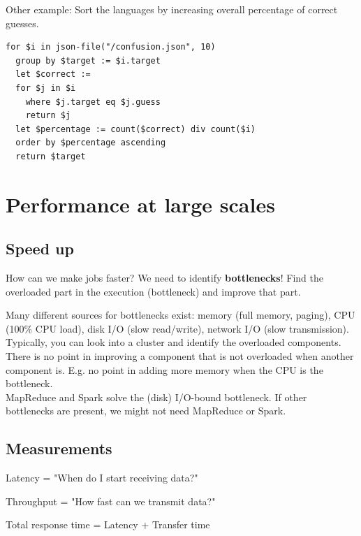 \documentclass[11pt,oneside,a4paper]{article}
\begin{document}
{Other example: Sort the languages by increasing overall percentage of correct guesses.

\begin{lstlisting}[basicstyle=\small]
for $i in json-file("/confusion.json", 10)
  group by $target := $i.target
  let $correct :=
  for $j in $i
    where $j.target eq $j.guess
    return $j
  let $percentage := count($correct) div count($i)
  order by $percentage ascending
  return $target
\end{lstlisting}

\newpage

\section{Performance at large scales}

\subsection{Speed up}

How can we make jobs faster? We need to identify \textbf{bottlenecks}! Find the overloaded part in the execution (bottleneck) and improve that part.

Many different sources for bottlenecks exist: memory (full memory, paging), CPU (100\% CPU load), disk I/O (slow read/write), network I/O (slow transmission). Typically, you can look into a cluster and identify the overloaded components. There is no point in improving a component that is not overloaded when another component is. E.g. no point in adding more memory when the CPU is the bottleneck.\\

MapReduce and Spark solve the (disk) I/O-bound bottleneck. If other bottlenecks are present, we might not need MapReduce or Spark.


\subsection{Measurements}

Latency = "When do I start receiving data?"

Throughput = "How fast can we transmit data?"

Total response time = Latency + Transfer time

}
\end{document}
